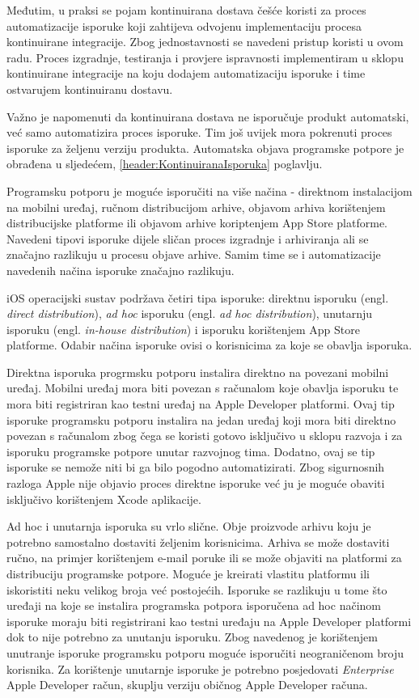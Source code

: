 \documentclass[times, utf8, diplomski, numeric]{fer}
\newcommand{\eng}[1]{(engl. \textit{#1})}
\begin{document}
Međutim, u praksi se pojam kontinuirana dostava češće koristi za proces automatizacije isporuke koji zahtijeva odvojenu implementaciju procesa kontinuirane integracije. Zbog jednostavnosti se navedeni pristup koristi u ovom radu. Proces izgradnje, testiranja i provjere ispravnosti implementiram u sklopu kontinuirane integracije na koju dodajem automatizaciju isporuke i time ostvarujem kontinuiranu dostavu.

Važno je napomenuti da kontinuirana dostava ne isporučuje produkt automatski, već samo automatizira proces isporuke. Tim još uvijek mora pokrenuti proces isporuke za željenu verziju produkta. Automatska objava programske potpore je obrađena u sljedećem, \ref{header:KontinuiranaIsporuka} poglavlju.

Programsku potporu je moguće isporučiti na više načina - direktnom instalacijom na mobilni uređaj, ručnom distribucijom arhive, objavom arhiva korištenjem distribucijske platforme ili objavom arhive koriptenjem App Store platforme. Navedeni tipovi isporuke dijele sličan proces izgradnje i arhiviranja ali se značajno razlikuju u procesu objave arhive. Samim time se i automatizacije navedenih načina isporuke značajno razlikuju.

iOS operacijski sustav podržava četiri tipa isporuke: direktnu isporuku \eng{direct distribution}, \textit{ad hoc} isporuku \eng{ad hoc distribution}, unutarnju isporuku \eng{in-house distribution} i isporuku korištenjem App Store platforme. Odabir načina isporuke ovisi o korisnicima za koje se obavlja isporuka.

Direktna isporuka progrmsku potporu instalira direktno na povezani mobilni uređaj. Mobilni uređaj mora biti povezan s računalom koje obavlja isporuku te mora biti registriran kao testni uređaj na Apple Developer platformi. Ovaj tip isporuke programsku potporu instalira na jedan uređaj koji mora biti direktno povezan s računalom zbog čega se koristi gotovo isključivo u sklopu razvoja i za isporuku programske potpore unutar razvojnog tima. Dodatno, ovaj se tip isporuke se nemože niti bi ga bilo pogodno automatizirati. Zbog sigurnosnih razloga Apple nije objavio proces direktne isporuke već ju je moguće obaviti isključivo korištenjem Xcode aplikacije.

Ad hoc i unutarnja isporuka su vrlo slične. Obje proizvode arhivu koju je potrebno samostalno dostaviti željenim korisnicima. Arhiva se može dostaviti ručno, na primjer korištenjem e-mail poruke ili se može objaviti na platformi za distribuciju programske potpore. Moguće je kreirati vlastitu platformu ili iskoristiti neku velikog broja već postojećih. Isporuke se razlikuju u tome što uređaji na koje se instalira programska potpora isporučena ad hoc načinom isporuke moraju biti registrirani kao testni uređaju na Apple Developer platformi dok to nije potrebno za unutanju isporuku. Zbog navedenog je korištenjem unutranje isporuke programsku potporu moguće isporučiti neograničenom broju korisnika. Za korištenje unutarnje isporuke je potrebno posjedovati \textit{Enterprise} Apple Developer račun, skuplju verziju običnog Apple Developer računa.
\end{document}
